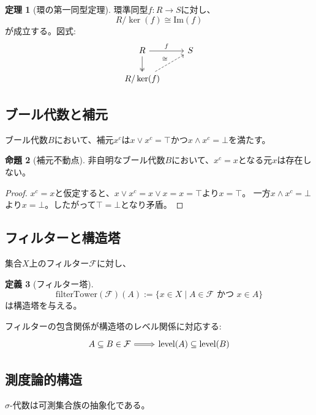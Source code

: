 \documentclass[a4paper,12pt]{ltjsarticle}
\theoremstyle{definition}
\newtheorem{theorem}{定理}[section]
\newtheorem{proposition}[theorem]{命題}
\newtheorem{definition}[theorem]{定義}
\begin{document}
\begin{theorem}[環の第一同型定理]\label{thm:ring-first-iso}
環準同型$f: R \to S$に対し、
\[
R / \ker(f) \cong \text{Im}(f)
\]
が成立する。図式:
\begin{equation*}
\begin{tikzcd}
R \arrow[r, "f"] \arrow[d, two heads] & S \\
R/\ker(f) \arrow[ur, dashed, "\cong"] &
\end{tikzcd}
\end{equation*}
\end{theorem}

\subsection{ブール代数と補元}
ブール代数$B$において、補元$x^c$は$x \vee x^c = \top$かつ$x \wedge x^c = \bot$を満たす。

\begin{proposition}[補元不動点]\label{prop:complement-fixed}
非自明なブール代数$B$において、$x^c = x$となる元$x$は存在しない。
\end{proposition}

\begin{proof}
$x^c = x$と仮定すると、$x \vee x^c = x \vee x = x = \top$より$x = \top$。
一方$x \wedge x^c = \bot$より$x = \bot$。したがって$\top = \bot$となり矛盾。
\end{proof}

\subsection{フィルターと構造塔}
集合$X$上のフィルター$\mathcal{F}$に対し、

\begin{definition}[フィルター塔]\label{def:filter-tower}
\[
\text{filterTower}(\mathcal{F})(A) := \{x \in X \mid A \in \mathcal{F} \text{ かつ } x \in A\}
\]
は構造塔を与える。
\end{definition}

フィルターの包含関係が構造塔のレベル関係に対応する:
\begin{equation*}
\begin{tikzcd}
A \subseteq B \in \mathcal{F} \arrow[r, Rightarrow] & \text{level}(A) \subseteq \text{level}(B)
\end{tikzcd}
\end{equation*}

\subsection{測度論的構造}
$\sigma$-代数は可測集合族の抽象化である。
\end{document}
